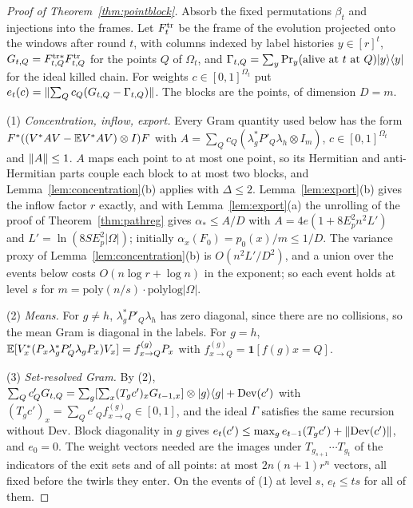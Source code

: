 \begin{proof}[Proof of Theorem~\ref{thm:pointblock}]
Absorb the fixed permutations $\beta_t$ and injections into the frames. Let $F^{\rm tr}_t$ be the frame of the evolution projected onto the windows after round $t$, with
columns indexed by label histories $y\in[r]^t$, $G_{t,Q}=F^{{\rm tr}*}_{t,Q}F^{\rm tr}_{t,Q}$ for the points $Q$ of $\Omega_t$, and $\Gamma_{t,Q}=\sum_y\Pr_y(\text{alive at }t\text{ at }Q)\lvert y\rangle\langle y\rvert$
for the ideal killed chain. For weights $c\in[0,1]^{\Omega_t}$ put $e_t(c)=\lVert \sum_Qc_Q(G_{t,Q}-\Gamma_{t,Q})\rVert$. The blocks are the points, of dimension $D=m$.

(1) \emph{Concentration, inflow, export.} Every Gram quantity used below has the form $F^*((V^*AV-\mathbb E V^*AV)\otimes I)F$ with
$A=\sum_Qc_Q(\lambda_g^*P'_Q\lambda_h\otimes I_m)$, $c\in[0,1]^{\Omega_t}$ and $\lVert A\rVert\le1$. $A$ maps each point to at most one point, so its Hermitian and anti-Hermitian
parts couple each block to at most two blocks, and Lemma~\ref{lem:concentration}(b) applies with $\Delta\le2$. Lemma~\ref{lem:export}(b) gives the inflow factor $r$
exactly, and with Lemma~\ref{lem:export}(a) the unrolling of the proof of Theorem~\ref{thm:pathreg} gives $\alpha_*\le A/D$ with $A=4e(1+8E_p^2n^2L')$ and
$L'=\ln(8SE_p^2|\Omega|)$; initially $\alpha_x(F_0)=p_0(x)/m\le1/D$. The variance proxy of Lemma~\ref{lem:concentration}(b) is $O(n^2L'/D^2)$, and a union over the
events below costs $O(n\log r+\log n)$ in the exponent; so each event holds at level $s$ for $m=\mathrm{poly}(n/s)\cdot\mathrm{polylog}|\Omega|$.

(2) \emph{Means.} For $g\ne h$, $\lambda_g^*P'_Q\lambda_h$ has zero diagonal, since there are no collisions, so the mean Gram is diagonal in the labels. For $g=h$,
$\mathbb E[V_x^*(P_x\lambda_g^*P'_Q\lambda_gP_x)V_x]=f^{(g)}_{x\to Q}P_x$ with $f^{(g)}_{x\to Q}=\mathbf 1[f(g)x=Q]$.

(3) \emph{Set-resolved Gram.} By (2), $\sum_Qc'_QG_{t,Q}=\sum_g[\sum_x(T_gc')_xG_{t-1,x}]\otimes\lvert g\rangle\langle g\rvert+\mathrm{Dev}(c')$ with $(T_gc')_x=\sum_Qc'_Qf^{(g)}_{x\to Q}\in[0,1]$,
and the ideal $\Gamma$ satisfies the same recursion without $\mathrm{Dev}$. Block diagonality in $g$ gives $e_t(c')\le\max_ge_{t-1}(T_gc')+\lVert \mathrm{Dev}(c')\rVert$, and $e_0=0$. The
weight vectors needed are the images under $T_{g_{s+1}}\cdots T_{g_t}$ of the indicators of the exit sets and of all points: at most $2n(n+1)r^n$ vectors, all fixed before the
twirls they enter. On the events of (1) at level $s$, $e_t\le ts$ for all of them.


\end{proof}
